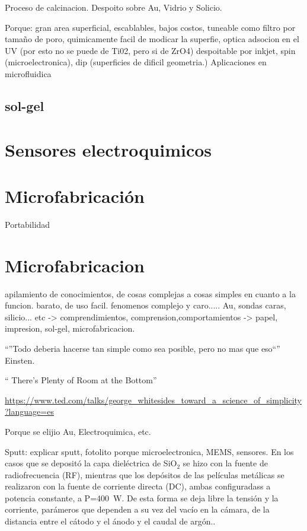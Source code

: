 				Proceso de calcinacion. Despoito sobre Au, Vidrio y Solicio.

				Porque: gran area superficial, escablables, bajos costos, tuneable como filtro por tamaño de poro, quimicamente facil de modicar la superfie, optica adsocion en el UV (por esto no se puede de Ti02, pero si de ZrO4) despoitable por inkjet\cite{Lian2013,Mougenot2006a}, spin (microelectronica), dip (superficies de dificil geometria.)
				Aplicaciones en microfluidica \cite{schmuhl2005,Martinez2009}
				
	\subsection{sol-gel}	

\section{Sensores electroquimicos}

\section{Microfabricación}

Portabilidad

\section{Microfabricacion}\label{sec:microfabricacion}
apilamiento de conocimientos, de cosas complejas a cosas simples en cuanto a la funcion. barato, de uso facil.
fenomenos complejo y caro..... Au, sondas caras, silicio... etc -> comprendimientos, comprension,comportamientos -> papel, impresion, sol-gel, \cite{Whitesides2015,Burdass2010}microfabricacion.

``''Todo deberia hacerse tan simple como sea posible, pero no mas que eso``'' Einsten.

`` There's Plenty of Room at the Bottom''

\url{https://www.ted.com/talks/george_whitesides_toward_a_science_of_simplicity?language=es}\cite{ted_whitesides2010}

Porque se elijio Au, Electroquimica, etc.

Sputt: explicar sputt, fotolito porque microelectronica, MEMS, sensores.
En los casos que se depositó la capa dieléctrica de SiO$_2$ se hizo con la fuente de radiofrecuencia (RF), mientras que los depósitos de las películas metálicas se realizaron con la fuente de corriente directa (DC), ambas configuradass a potencia constante, a P=\SI{400}{\watt}.  De esta forma se deja libre la tensión y la corriente, parámeros que dependen a su vez del vacío en la cámara, de la distancia entre el cátodo y el ánodo y el caudal de argón.\cite{sigmund1968}. 

